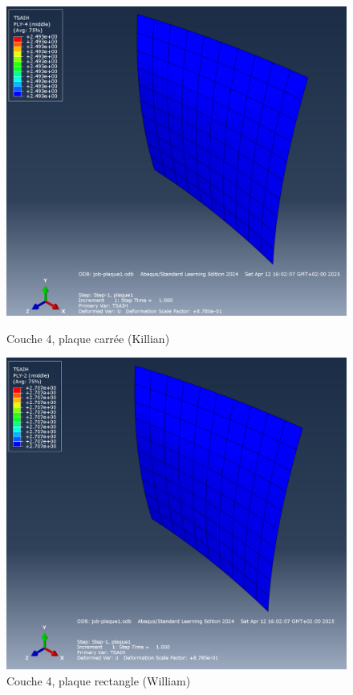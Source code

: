 \documentclass[a4paper,12pt]{article}
\begin{document}
\begin{figure}[h!]
	\centering
	\begin{minipage}{0.495\textwidth}
		\centering
		\includegraphics[width=\textwidth]{media/K_P1_L4_12042025.png} %
		\caption{Couche 4, plaque carrée (Killian)}
		\label{fig:image1}
	\end{minipage}
	\hfill
	\begin{minipage}{0.495\textwidth}
		\centering
		\includegraphics[width=\textwidth]{media/K_P1_L2_12042025.png} %
		\caption{Couche 4, plaque rectangle (William)}
		\label{fig:image2}
	\end{minipage}
\end{figure}
\end{document}
